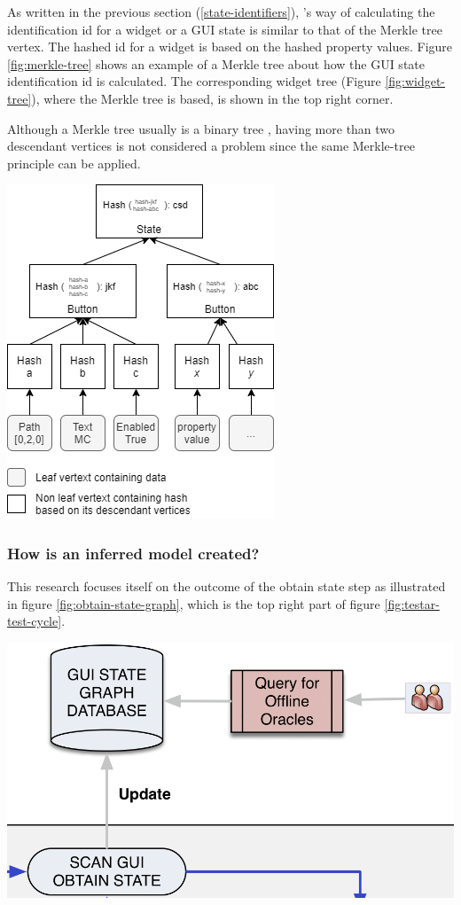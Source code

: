 As written in the previous section (\ref{state-identifiers}), \testar's way of calculating the identification id for a widget or a GUI state is similar to that of the Merkle tree vertex. The hashed id for a widget is based on the hashed property values. Figure \ref{fig:merkle-tree} shows an example of a Merkle tree about how the GUI state identification id is calculated. The corresponding widget tree (Figure \ref{fig:widget-tree}), where the Merkle tree is based, is shown in the top right corner.

Although a Merkle tree usually is a binary tree \cite{merkle-tree}, having more than two descendant vertices is not considered a problem since the same Merkle-tree principle can be applied.

\bigskip
\begingroup
\captionsetup{type=figure}
\includegraphics[scale=0.8]{images/merkle-tree-example.png}
\label{fig:merkle-tree}
\endgroup

\subsubsection{How is an inferred model created?}
This research focuses itself on the outcome of the obtain state step as illustrated in figure \ref{fig:obtain-state-graph}, which is the top right part of figure \ref{fig:testar-test-cycle}.

\bigskip
\begingroup
\captionsetup{type=figure}
\includegraphics[scale=0.4]{images/obtain-state-graph.png}
\label{fig:obtain-state-graph}
\endgroup

